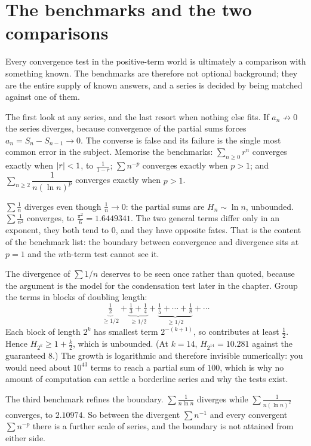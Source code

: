 \section{The benchmarks and the two comparisons}

Every convergence test in the positive-term world is ultimately a comparison with something known. The benchmarks are therefore not optional background; they are the entire supply of known answers, and a series is decided by being matched against one of them.

\cue The first look at any series, and the last resort when nothing else fits.
\method If $a_n\not\to0$ the series diverges, because convergence of the partial sums forces $a_n=S_n-S_{n-1}\to0$. The converse is false and its failure is the single most common error in the subject. Memorise the benchmarks: $\sum_{n\geq0}r^n$ converges exactly when $\left\lvert r\right\rvert<1$, to $\tfrac{1}{1-r}$; $\sum n^{-p}$ converges exactly when $p>1$; and $\sum_{n\geq2}\dfrac{1}{n(\ln n)^{p}}$ converges exactly when $p>1$.

\begin{worked}
$\sum\tfrac1n$ diverges even though $\tfrac1n\to0$: the partial sums are $H_n\sim\ln n$, unbounded. $\sum\tfrac{1}{n^2}$ converges, to $\tfrac{\pi^2}{6}=1.6449341$. The two general terms differ only in an exponent, they both tend to $0$, and they have opposite fates. That is the content of the benchmark list: the boundary between convergence and divergence sits at $p=1$ and the $n$th-term test cannot see it.

The divergence of $\sum1/n$ deserves to be seen once rather than quoted, because the argument is the model for the condensation test later in the chapter. Group the terms in blocks of doubling length:
\[\underbrace{\tfrac12}_{\geq1/2}+\underbrace{\tfrac13+\tfrac14}_{\geq1/2}+\underbrace{\tfrac15+\cdots+\tfrac18}_{\geq1/2}+\cdots\]
Each block of length $2^{k}$ has smallest term $2^{-(k+1)}$, so contributes at least $\tfrac12$. Hence $H_{2^k}\geq1+\tfrac{k}{2}$, which is unbounded. (At $k=14$, $H_{2^{14}}=10.281$ against the guaranteed $8$.) The growth is logarithmic and therefore invisible numerically: you would need about $10^{43}$ terms to reach a partial sum of $100$, which is why no amount of computation can settle a borderline series and why the tests exist.

The third benchmark refines the boundary. $\sum\tfrac{1}{n\ln n}$ diverges while $\sum\tfrac{1}{n(\ln n)^2}$ converges, to $2.10974$. So between the divergent $\sum n^{-1}$ and every convergent $\sum n^{-p}$ there is a further scale of series, and the boundary is not attained from either side.
\end{worked}

